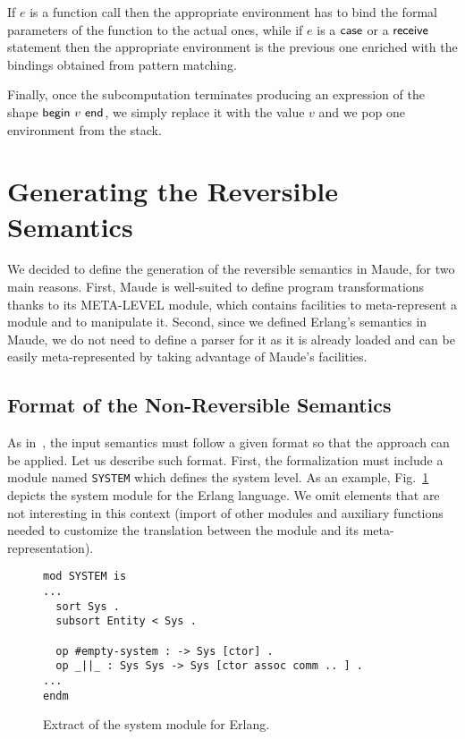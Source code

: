 \documentclass{article}[12pt,a4paper]
\theoremstyle{definition}
\begin{document}
If $e$ is a function call then the
appropriate environment has to bind the formal parameters of
the function to the actual ones, while if $e$ is a $\mathsf{case}$ or a
$\mathsf{receive}$ statement then the appropriate environment is the previous one enriched
with the bindings obtained from pattern matching.

Finally, once the subcomputation terminates producing an expression of the shape $\mathsf{begin}~v~\mathsf{end}$, we simply replace it
with the value $v$ and we pop one environment from the stack. 

\section{Generating the Reversible Semantics}\label{sec:generating}
We decided to define the generation of the reversible semantics in Maude,
for two main reasons. First, Maude is well-suited to define program transformations
thanks to its META-LEVEL module, which contains facilities to meta-represent a
module and to manipulate it. Second, since we defined Erlang's semantics in
Maude, we do not need to define a parser for it as it is already loaded and can
be easily meta-represented by taking advantage of Maude's facilities.

\subsection{Format of the Non-Reversible Semantics}
As in~\cite{LaneseM20}, the input semantics must follow a given format
so that the approach can be applied.  Let us describe such
format. First, the formalization must include a module named
\verb+SYSTEM+ which defines the system level. As an example,
Fig.~\ref{fig:sem-system} depicts the system module for the Erlang
language. We omit elements that are not interesting in this context
(import of other modules and auxiliary functions needed to customize
the translation between the module and its meta-representation).

\begin{figure}[t]
\begin{Verbatim}
mod SYSTEM is 
...
  sort Sys .
  subsort Entity < Sys .

  op #empty-system : -> Sys [ctor] .
  op _||_ : Sys Sys -> Sys [ctor assoc comm .. ] .
...
endm
\end{Verbatim}
  \label{fig:sem-system}
  \caption{Extract of the system module for Erlang.}
\end{figure}
\end{document}
